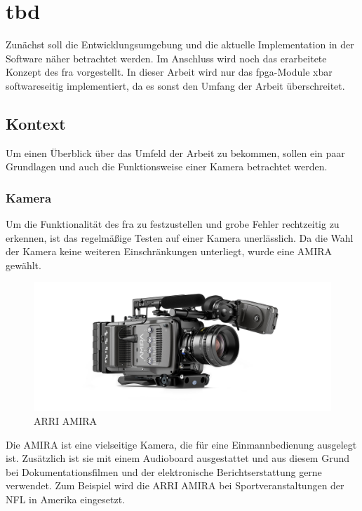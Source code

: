 \chapter{tbd} \label{sec:imp}
Zunächst soll die Entwicklungsumgebung und die aktuelle Implementation in der Software näher betrachtet werden. Im Anschluss wird noch das erarbeitete Konzept des \ac{fra} vorgestellt.
In dieser Arbeit wird nur das \ac{fpga}-Module \ac{xbar} softwareseitig implementiert, da es sonst den Umfang der Arbeit überschreitet. 

\section{Kontext}
Um einen Überblick über das Umfeld der Arbeit zu bekommen, sollen ein paar Grundlagen und auch die Funktionsweise einer Kamera betrachtet werden. 

\subsection{Kamera}
Um die Funktionalität des \ac{fra} zu festzustellen und grobe Fehler rechtzeitig zu erkennen, ist das regelmäßige Testen auf einer Kamera unerlässlich. Da die Wahl der Kamera keine weiteren Einschränkungen unterliegt, wurde eine AMIRA gewählt. 
\begin{figure}[!hbtp]
	\centering
	\includegraphics[width = 0.7\linewidth]{pictures/amira-product-image-data.jpg}
	\smallskip
	\caption{ARRI AMIRA}
	\label{fig:amira}
\end{figure}  

Die AMIRA ist eine vielseitige Kamera, die für eine Einmannbedienung ausgelegt ist.
Zusätzlich ist sie mit einem Audioboard ausgestattet und aus diesem Grund bei Dokumentationsfilmen und der elektronische Berichtserstattung gerne verwendet. Zum Beispiel wird die ARRI AMIRA bei Sportveranstaltungen der NFL in Amerika eingesetzt. \cite{arrinewsamira} 

